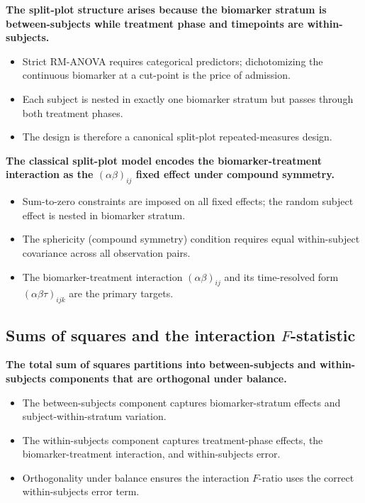\documentclass[
  11pt,
]{article}
\begin{document}
\textbf{The split-plot structure arises because the biomarker stratum is between-subjects while treatment phase and timepoints are within-subjects.}

\begin{itemize}\setlength{\itemsep}{2pt}\setlength{\parskip}{0pt}
\item Strict RM-ANOVA requires categorical predictors; dichotomizing the continuous biomarker at a cut-point is the price of admission.
\item Each subject is nested in exactly one biomarker stratum but passes through both treatment phases.
\item The design is therefore a canonical split-plot repeated-measures design.
\end{itemize}

\textbf{The classical split-plot model encodes the biomarker-treatment interaction as the $(\alpha\beta)_{ij}$ fixed effect under compound symmetry.}

\begin{itemize}\setlength{\itemsep}{2pt}\setlength{\parskip}{0pt}
\item Sum-to-zero constraints are imposed on all fixed effects; the random subject effect is nested in biomarker stratum.
\item The sphericity (compound symmetry) condition requires equal within-subject covariance across all observation pairs.
\item The biomarker-treatment interaction $(\alpha\beta)_{ij}$ and its time-resolved form $(\alpha\beta\tau)_{ijk}$ are the primary targets.
\end{itemize}

\subsection{\texorpdfstring{Sums of squares and the interaction \(F\)-statistic}{Sums of squares and the interaction F-statistic}}\label{sums-of-squares-and-the-interaction-f-statistic}

\textbf{The total sum of squares partitions into between-subjects and within-subjects components that are orthogonal under balance.}

\begin{itemize}\setlength{\itemsep}{2pt}\setlength{\parskip}{0pt}
\item The between-subjects component captures biomarker-stratum effects and subject-within-stratum variation.
\item The within-subjects component captures treatment-phase effects, the biomarker-treatment interaction, and within-subjects error.
\item Orthogonality under balance ensures the interaction $F$-ratio uses the correct within-subjects error term.
\end{itemize}
\end{document}
